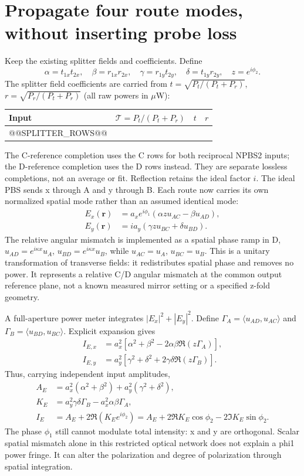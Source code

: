 \documentclass[11pt,a4paper]{article}
\begin{document}
\section{Propagate four route modes, without inserting probe loss}
Keep the existing splitter fields and coefficients. Define
\[
\alpha=t_{1x}t_{2x},\quad\beta=r_{1x}r_{2x},\quad
\gamma=r_{1y}t_{2y},\quad\delta=t_{1y}r_{2y},\quad z=e^{i\phi_2}.
\]
The splitter field coefficients are carried from $t=\sqrt{P_t/(P_t+P_r)}$,
$r=\sqrt{P_r/(P_t+P_r)}$ (all raw powers in $\mu$W):
\begin{center}\begin{tabular}{lrrr}\toprule
Input & $\mathcal T=P_t/(P_t+P_r)$ & $t$ & $r$ \\\midrule
@@SPLITTER_ROWS@@
\bottomrule\end{tabular}\end{center}
The C-reference completion uses the C rows for both reciprocal NPBS2 inputs;
the D-reference completion uses the D rows instead. They are separate lossless
completions, not an average or fit. Reflection retains the ideal factor $i$.
The ideal PBS sends x through A and y through B. Each route now carries its
own normalized spatial mode rather than an assumed identical mode:
\begin{align}
E_x(\mathbf r)&=a_xe^{i\phi_1}(\alpha z u_{AC}-\beta u_{AD}),\\
E_y(\mathbf r)&=ia_y(\gamma z u_{BC}+\delta u_{BD}).
\end{align}
The relative angular mismatch is implemented as a spatial phase ramp in D,
$u_{AD}=e^{i\kappa x}u_A$, $u_{BD}=e^{i\kappa x}u_B$, while
$u_{AC}=u_A$, $u_{BC}=u_B$. This is a unitary transformation of transverse
fields: it redistributes spatial phase and removes no power. It represents
a relative C/D angular mismatch at the common output reference plane, not a
known measured mirror setting or a specified z-fold geometry.

A full-aperture power meter integrates $|E_x|^2+|E_y|^2$. Define
$\Gamma_A=\langle u_{AD},u_{AC}\rangle$ and
$\Gamma_B=\langle u_{BD},u_{BC}\rangle$. Explicit expansion gives
\begin{align}
I_{E,x}&=a_x^2[\alpha^2+\beta^2-2\alpha\beta\Re(z\Gamma_A)],\\
I_{E,y}&=a_y^2[\gamma^2+\delta^2+2\gamma\delta\Re(z\Gamma_B)].
\end{align}
Thus, carrying independent input amplitudes,
\begin{align}
A_E&=a_x^2(\alpha^2+\beta^2)+a_y^2(\gamma^2+\delta^2),\\
K_E&=a_y^2\gamma\delta\Gamma_B-a_x^2\alpha\beta\Gamma_A,\\
\boxed{I_E}&=\boxed{A_E+2\Re(K_Ee^{i\phi_2})
=A_E+2\Re K_E\cos\phi_2-2\Im K_E\sin\phi_2.}
\end{align}
The phase $\phi_1$ still cannot modulate total intensity: x and y are orthogonal.
Scalar spatial mismatch alone in this restricted optical network does not
explain a phi1 power fringe. It can alter the polarization and degree of
polarization through spatial integration.
\end{document}
